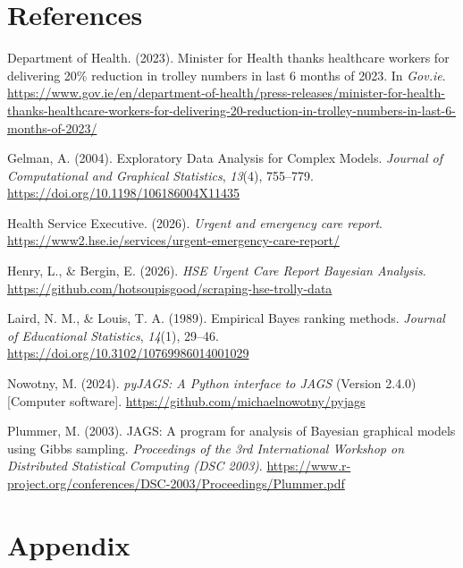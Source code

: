 \documentclass[
]{article}
\newlength{\cslhangindent}
\newenvironment{CSLReferences}[2] %
 {\begin{list}{}{%
  \setlength{\itemindent}{0pt}
  \setlength{\leftmargin}{0pt}
  \setlength{\parsep}{0pt}
  \ifodd #1
   \setlength{\leftmargin}{\cslhangindent}
   \setlength{\itemindent}{-1\cslhangindent}
  \fi
  \setlength{\itemsep}{#2\baselineskip}}}
 {\end{list}}
\begin{document}
\section{References}\label{references}

\protect{}\label{refs}
\begin{CSLReferences}{1}{0}
Department of Health. (2023). Minister for {Health} thanks healthcare workers for delivering 20\% reduction in trolley numbers in last 6 months of 2023. In \emph{Gov.ie}. \url{https://www.gov.ie/en/department-of-health/press-releases/minister-for-health-thanks-healthcare-workers-for-delivering-20-reduction-in-trolley-numbers-in-last-6-months-of-2023/}

Gelman, A. (2004). Exploratory {Data} {Analysis} for {Complex} {Models}. \emph{Journal of Computational and Graphical Statistics}, \emph{13}(4), 755--779. \url{https://doi.org/10.1198/106186004X11435}

Health Service Executive. (2026). \emph{Urgent and emergency care report}. \url{https://www2.hse.ie/services/urgent-emergency-care-report/}

Henry, L., \& Bergin, E. (2026). \emph{{HSE} {Urgent} {Care} {Report} {Bayesian} {Analysis}}. \url{https://github.com/hotsoupisgood/scraping-hse-trolly-data}

Laird, N. M., \& Louis, T. A. (1989). Empirical {B}ayes ranking methods. \emph{Journal of Educational Statistics}, \emph{14}(1), 29--46. \url{https://doi.org/10.3102/10769986014001029}

Nowotny, M. (2024). \emph{{pyJAGS}: A {P}ython interface to {JAGS}} (Version 2.4.0) {[}Computer software{]}. \url{https://github.com/michaelnowotny/pyjags}

Plummer, M. (2003). {JAGS}: A program for analysis of {B}ayesian graphical models using {G}ibbs sampling. \emph{Proceedings of the 3rd International Workshop on Distributed Statistical Computing ({DSC} 2003)}. \url{https://www.r-project.org/conferences/DSC-2003/Proceedings/Plummer.pdf}

\end{CSLReferences}

\newpage

\section{Appendix}\label{appendix}
\end{document}
